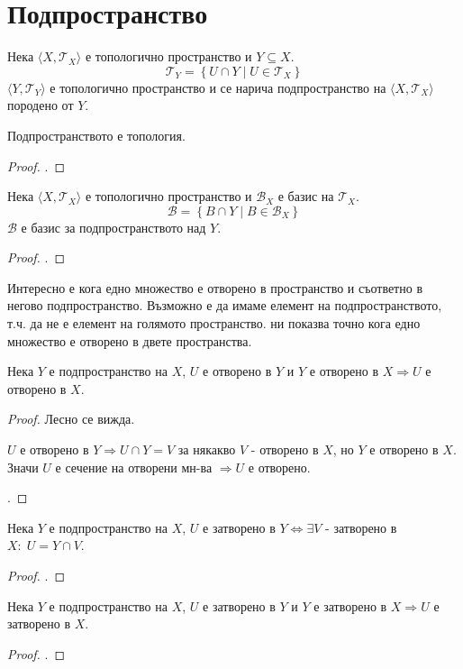 \section{Подпространство}
\begin{definition}
    Нека $\langle X, \mathcal T_X \rangle$ е топологично пространство и $Y \subseteq X$.
    \begin{equation*}
        \mathcal T_Y = \left\{ U \cap Y \mid U \in \mathcal T_X \right\}
    \end{equation*}
    $\langle Y, \mathcal T_Y\rangle$ е топологично пространство и се нарича подпространство на $\langle X, \mathcal T_X \rangle$ породено от $Y$.
\end{definition}
\begin{lemma}
    Подпространството е топология.
\end{lemma}
\begin{proof}
    \cite[p.~89]{munkrestopology}.
\end{proof}
\begin{lemma}
    Нека $\langle X, \mathcal T_X \rangle$ е топологично пространство и $\mathcal B_X$ е базис на $\mathcal T_X$.
    \begin{equation*}
        \mathcal B = \left\{ B \cap Y \mid B \in \mathcal B_X \right\}
    \end{equation*}
    $\mathcal B$ е базис за подпространството над $Y$.
\end{lemma}
\begin{proof}
    \cite[p.~89]{munkrestopology}.
\end{proof}
Интересно е кога едно множество е отворено в пространство и съответно в негово подпространство. Възможно е да имаме елемент на подпространството, т.ч. да не е елемент на голямото пространство.  ни показва точно кога едно множество е отворено в двете пространства.
\begin{lemma}\label{lem:open-in-subspace}
    Нека $Y$ е подпространство на $X$, $U$ е отворено в $Y$ и $Y$ е отворено в $X \Rightarrow U$ е отворено в $X$.
\end{lemma}
\begin{proof}
    Лесно се вижда.

    $U$ е отворено в $Y \Rightarrow U \cap Y = V$ за някакво $V$ - отворено в $X$, но $Y$ е отворено в $X$. Значи $U$ е сечение на отворени мн-ва $\Rightarrow U$ е отворено.

    \cite[p.~89]{munkrestopology}.
\end{proof}
\begin{lemma}
    Нека $Y$ е подпространство на $X$, $U$ е затворено в $Y \iff \exists V $ - затворено в $X:\; U = Y \cap V$.
\end{lemma}
\begin{proof}
    \cite[p.~94]{munkrestopology}.
\end{proof}
\begin{lemma}
    Нека $Y$ е подпространство на $X$, $U$ е затворено в $Y$ и $Y$ е затворено в $X \Rightarrow U$ е затворено в $X$.
\end{lemma}
\begin{proof}
    \cite[p.~95]{munkrestopology}.
\end{proof}

